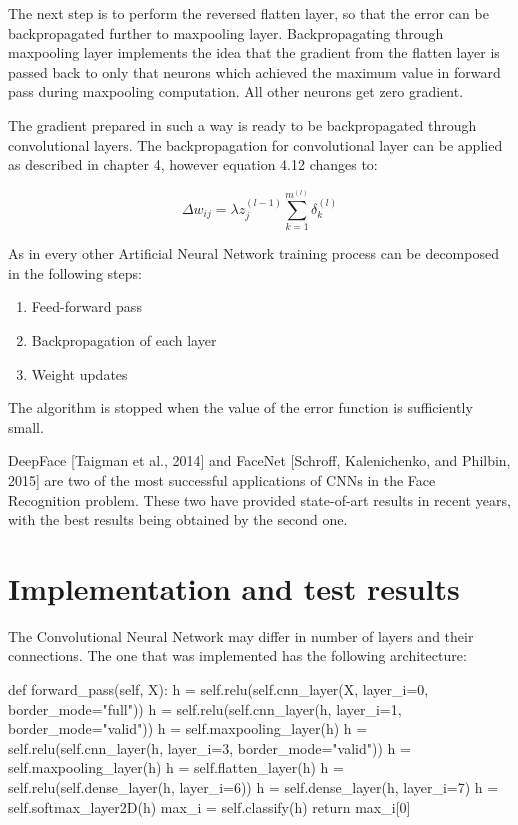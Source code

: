 The next step is to perform the reversed flatten layer, so that the error can be backpropagated further to maxpooling layer. Backpropagating through maxpooling layer implements the idea that the gradient from the flatten layer is passed back to only that neurons which achieved the maximum value in forward pass during maxpooling computation. All other neurons get zero gradient.

The gradient prepared in such a way is ready to be backpropagated through convolutional layers.
The backpropagation for convolutional layer can be applied as described in chapter 4, however equation 4.12 changes to:

\begin{equation}
\Delta w_{ij} = \lambda z_{j}^{(l-1)} \sum_{k=1}^{m^{(l)}}\delta_k^{(l)}
\end{equation}

As in every other Artificial Neural Network training process can be decomposed in the following steps:

\begin{enumerate}
\itemsep0em 
\item Feed-forward pass
\item Backpropagation of each layer
\item Weight updates
\end{enumerate}

The algorithm is stopped when the value of the error function is sufficiently small.

DeepFace [Taigman et al., 2014] and FaceNet [Schroff, Kalenichenko, and Philbin, 2015] are two of the most successful applications of CNNs in the Face Recognition  problem. These two have provided state-of-art results in recent years, with the best results being obtained by the second one.

\section{Implementation and test results}

The Convolutional Neural Network may differ in number of layers and their connections. The one that was implemented has the following architecture:

\begin{python}
    def forward_pass(self, X):
        h = self.relu(self.cnn_layer(X, layer_i=0, border_mode="full"))
        h = self.relu(self.cnn_layer(h, layer_i=1, border_mode="valid"))
        h = self.maxpooling_layer(h)
        h = self.relu(self.cnn_layer(h, layer_i=3, border_mode="valid"))
        h = self.maxpooling_layer(h)
        h = self.flatten_layer(h)
        h = self.relu(self.dense_layer(h, layer_i=6))
        h = self.dense_layer(h, layer_i=7)
        h = self.softmax_layer2D(h)
        max_i = self.classify(h)
      	return max_i[0]
\end{python}

